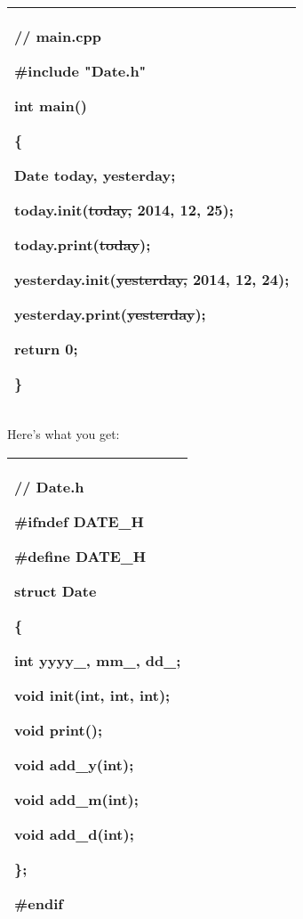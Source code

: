 \documentclass[
]{article}
\begin{document}
\begin{longtable}[]{@{}l@{}}
\toprule
\endhead
\begin{minipage}[t]{0.97\columnwidth}\raggedright
// main.cpp

\#include "Date.h"

int main()

\{

Date today, yesterday;

\textbf{today.}init(\sout{today,} 2014, 12, 25);

\textbf{today.}print(\sout{today});

\textbf{yesterday.}init(\sout{yesterday,} 2014, 12, 24);

\textbf{yesterday.}print(\sout{yesterday});

return 0;

\}\strut
\end{minipage}\tabularnewline
\bottomrule
\end{longtable}

Here's what you get:

\begin{longtable}[]{@{}l@{}}
\toprule
\endhead
\begin{minipage}[t]{0.97\columnwidth}\raggedright
// Date.h

\#ifndef DATE\_H

\#define DATE\_H

struct Date

\{

int yyyy\_, mm\_, dd\_;

void init(int, int, int);

void print();

void add\_y(int);

void add\_m(int);

void add\_d(int);

\};

\#endif\strut
\end{minipage}\tabularnewline
\bottomrule
\end{longtable}
\end{document}
